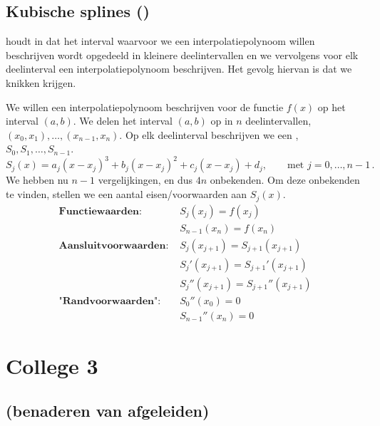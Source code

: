 \documentclass{2wn20summary}
\begin{document}
		\subsection{Kubische splines ()}
			
			\begin{define}
				 houdt in dat het interval waarvoor we een interpolatiepolynoom willen beschrijven wordt opgedeeld in kleinere deelintervallen en we vervolgens voor elk deelinterval een interpolatiepolynoom beschrijven. Het gevolg hiervan is dat we knikken krijgen.
			\end{define}
			
			\begin{define}
				We willen een interpolatiepolynoom beschrijven voor de functie $f(x)$ op het interval $(a,b)$. We delen het interval $(a,b)$ op in $n$ deelintervallen, $(x_0,x_1), \dotsc, (x_{n-1}, x_n)$. Op elk deelinterval beschrijven we een , $S_0, S_1, \dotsc, S_{n-1}$. 
				\[ 
					S_j(x) = a_j(x-x_j)^3 + b_j(x-x_j)^2 + c_j(x-x_j) + d_j, \qquad \text{met } j = 0, \dotsc, n-1\,.
				\]
				We hebben nu $n-1$ vergelijkingen, en dus $4n$ onbekenden. Om deze onbekenden te vinden, stellen we een aantal eisen/voorwaarden aan $ S_j(x) $.
				\begin{align*}
					\textbf{Functiewaarden: } &S_j(x_j) = f(x_j) \\
						&S_{n-1}(x_n) = f(x_n) \\
					\textbf{Aansluitvoorwaarden: } &S_j(x_{j+1}) = S_{j+1} (x_{j+1}) \\
						&S_j '(x_{j+1}) = S_{j+1} ' (x_{j+1}) \\
						&S_j '' (x_{j+1}) = S_{j+1} '' (x_{j+1}) \\
					\textbf{"Randvoorwaarden": } &S_0 ''(x_0) = 0 \\
						&S_{n-1} '' (x_n) = 0
				\end{align*}
			\end{define}
			
		\newpage
		\section{College 3}
		\subsection{ (benaderen van afgeleiden)}
		
			
\end{document}
